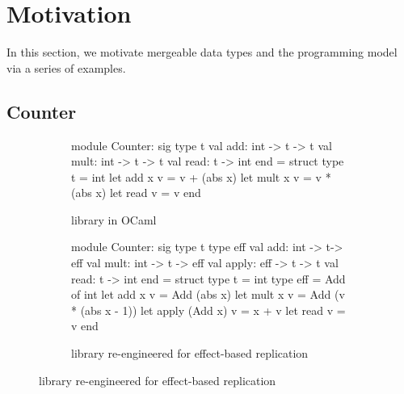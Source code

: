 \section{Motivation}

In this section, we motivate mergeable data types and the \name
programming model via a series of examples.

\subsection{Counter}

\begin{figure}

\begin{subfigure}[b]{0.4\textwidth}
  \begin{ocaml}
    module Counter: sig
      type t
      val add: int -> t -> t
      val mult: int -> t -> t
      val read: t -> int
    end = struct
      type t = int
      let add x v = v + (abs x)
      let mult x v = v * (abs x)
      let read v = v
    end
  \end{ocaml}

\caption{ library in OCaml}
\label{fig:counter-adt}
\end{subfigure}
\begin{subfigure}[b]{0.56\textwidth}
  \begin{ocaml}
    module Counter: sig
      type t
      type eff 
      val add: int -> t-> eff
      val mult: int -> t -> eff
      val apply: eff -> t -> t
      val read: t -> int
    end = struct
      type t = int
      type eff = Add of int
      let add x v = Add (abs x)
      let mult x v = Add (v * (abs x - 1))
      let apply (Add x) v = x + v
      let read v = v
    end
  \end{ocaml}

\caption{ library re-engineered for effect-based replication}
\label{fig:counter-rdt}
\end{subfigure}


\end{figure}

